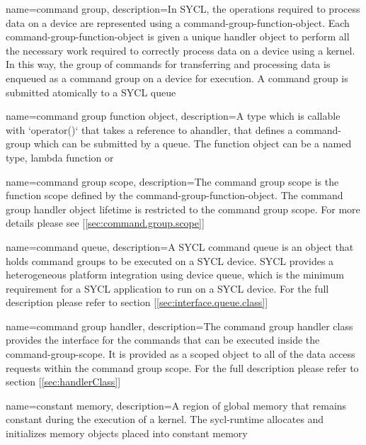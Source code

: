 {
  name={command group},
  description={In SYCL, the operations required to process data on a
    \gls{device} are represented using a \gls{command-group-function-object}.
    Each \gls{command-group-function-object} is given a unique \gls{handler} object
    to perform all the necessary work required to correctly process data
    on a \gls{device} using a kernel. In this way, the group of commands for
               transferring and processing data is enqueued as a command
               group on a \gls{device} for execution. A command group is submitted
               atomically to a SYCL queue}
}

{
  name={command group function object},
  description={A type which is callable with `operator()` that takes a reference
  to a\gls{handler}, that defines a \gls{command-group} which can be submitted
  by a \gls{queue}. The function object can be a named type, lambda function or
  }
}

{
  name={command group scope},
  description={The command group scope is the function scope defined by the
               \gls{command-group-function-object}. The command group \gls{handler} object lifetime
               is restricted to the command group scope. For more details
               please see [\ref{sec:command.group.scope}]}
}

{
  name={command queue},
  description={A SYCL command queue is an object that holds command
                groups to be executed on a SYCL \gls{device}. SYCL provides a
                heterogeneous platform integration using device queue, which is
                the minimum requirement for a SYCL application to run on a
                SYCL \gls{device}. For the full description please refer to
            section [\ref{sec:interface.queue.class}]}
}

{
  name={command group handler},
  description={The command group handler class provides the interface for the
               commands that can be executed inside the
               \gls{command-group-scope}. It is provided as a scoped object
               to all of the data access requests within the command group scope.
               For the full description please refer to section
         [\ref{sec:handlerClass}]}
}

{
  name={constant memory},
  description={A region of global memory that remains constant during the
               execution of a kernel. The \gls{sycl-runtime}
               allocates and initializes memory objects placed into constant
               memory}
}

